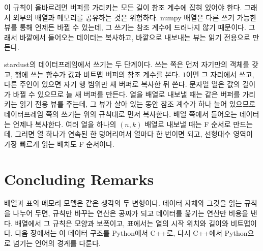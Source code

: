 이 규칙이 올바르려면 버퍼를 가리키는 모든 길이 참조 계수에 잡혀 있어야 한다. 그래서 외부의 배열과 메모리를 공유하는 것은 위험하다. numpy 배열은 다른 쓰기 가능한 뷰를 통해 언제든 바뀔 수 있는데, 그 쓰기는 참조 계수에 드러나지 않기 때문이다. 그래서 바깥에서 들어오는 데이터는 복사하고, 바깥으로 내보내는 뷰는 읽기 전용으로 만든다.

\begin{instardust}
stardust의 데이터프레임에서 쓰기는 두 단계이다. 쓰는 쪽은 먼저 자기만의  객체를 갖고, 행에 쓰는 함수가 값과 비트맵 버퍼의 참조 계수를 본다. $1$이면 그 자리에서 쓰고, 다른 주인이 있으면 자기 행 범위만 새 버퍼로 복사한 뒤 쓴다. 문자열 열은 값의 길이가 바뀔 수 있으므로 늘 새 버퍼를 만든다. 열을 배열로 내보낼 때는 같은 버퍼를 가리키는 읽기 전용 뷰를 주는데, 그 뷰가 살아 있는 동안 참조 계수가 하나 늘어 있으므로 데이터프레임 쪽의 쓰기는 위의 규칙대로 먼저 복사한다. 배열 쪽에서 들어오는 데이터는 언제나 복사한다. 여러 열을 하나의 $(n,k)$ 배열로 내보낼 때는 F 순서로 만드는데, 그러면 열 하나가 연속된 한 덩어리여서 열마다  한 번이면 되고, 선형대수 영역이 가장 빠르게 읽는 배치도 F 순서이다.
\end{instardust}

\section{Concluding Remarks}

배열과 표의 메모리 모델은 같은 생각의 두 변형이다. 데이터 자체와 그것을 읽는 규칙을 나누어 두면, 규칙만 바꾸는 연산은 공짜가 되고 데이터를 옮기는 연산만 비용을 낸다. 배열에서 그 규칙은 모양과 보폭이고, 표에서는 열의 시작 위치와 길이와 비트맵이다. 다음 장에서는 이 데이터 구조를 Python에서 C++로, 다시 C++에서 Python으로 넘기는 언어의 경계를 다룬다.

\chapterreferences
